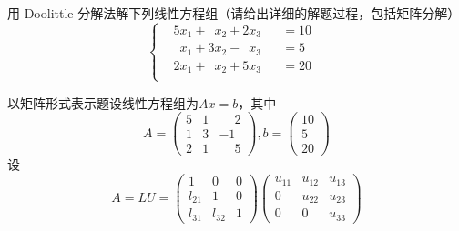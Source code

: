 \documentclass[11pt]{article}
\begin{document}
\begin{question}

    \questiontext
    {
        用 Doolittle 分解法解下列线性方程组（请给出详细的解题过程，包括矩阵分解）
        \begin{equation*}
            \left\{
            \begin{aligned}
                 & 5x_1 + \phantom{1}x_2 + 2x_3           &  & = 10 & \\
                 & \phantom{1}x_1 + 3x_2 - \phantom{1}x_3 &  & = 5  & \\
                 & 2x_1 + \phantom{1}x_2 + 5x_3           &  & = 20 & \\
            \end{aligned}
            \right.
        \end{equation*}
    }

    \answer
    {
        以矩阵形式表示题设线性方程组为$Ax = b$，其中
        \begin{equation*}
            A = \begin{pmatrix}
                5 & 1 & \phantom{-}2 \\
                1 & 3 & -1           \\
                2 & 1 & \phantom{-}5
            \end{pmatrix}
            , b = \begin{pmatrix}
                10 \\
                5  \\
                20
            \end{pmatrix}
        \end{equation*}
        设
        \begin{equation*}
            A = LU = \begin{pmatrix}
                1      & 0      & 0 \\
                l_{21} & 1      & 0 \\
                l_{31} & l_{32} & 1
            \end{pmatrix} \begin{pmatrix}
                u_{11} & u_{12} & u_{13} \\
                0      & u_{22} & u_{23} \\
                0      & 0      & u_{33}
            \end{pmatrix}
        \end{equation*}

}
\end{question}
\end{document}

